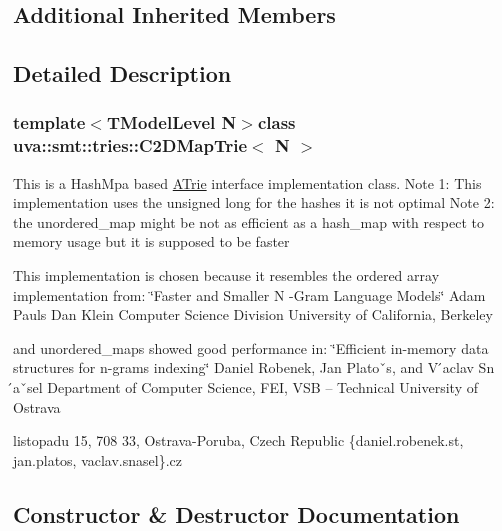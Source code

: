 \subsection*{Additional Inherited Members}


\subsection{Detailed Description}
\subsubsection*{template$<$T\+Model\+Level N$>$class uva\+::smt\+::tries\+::\+C2\+D\+Map\+Trie$<$ N $>$}

This is a Hash\+Mpa based \hyperlink{classuva_1_1smt_1_1tries_1_1_a_trie}{A\+Trie} interface implementation class. Note 1\+: This implementation uses the unsigned long for the hashes it is not optimal Note 2\+: the unordered\+\_\+map might be not as efficient as a hash\+\_\+map with respect to memory usage but it is supposed to be faster

This implementation is chosen because it resembles the ordered array implementation from\+: \char`\"{}\+Faster and Smaller N -\/\+Gram Language Models\char`\"{} Adam Pauls Dan Klein Computer Science Division University of California, Berkeley

and unordered\+\_\+maps showed good performance in\+: \char`\"{}\+Efficient in-\/memory data structures for n-\/grams indexing\char`\"{} Daniel Robenek, Jan Platoˇs, and V ́aclav Sn ́aˇsel Department of Computer Science, F\+E\+I, V\+S\+B – Technical University of Ostrava
\begin{DoxyEnumerate}
\item listopadu 15, 708 33, Ostrava-\/\+Poruba, Czech Republic \{daniel.\+robenek.\+st, jan.\+platos, vaclav.\+snasel\}.cz 
\end{DoxyEnumerate}

\subsection{Constructor \& Destructor Documentation}
\hypertarget{classuva_1_1smt_1_1tries_1_1_c2_d_map_trie_af38b3ad7ffd886314b07e820535da51c}{}
